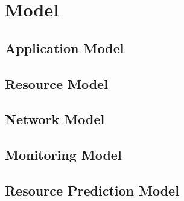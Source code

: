 \chapter{Model} %
\label{ch:model-methodology}

    \section{Application Model}
    \label{sec:application-model}
    \section{Resource Model}
    \label{sec:resource-model}
    \section{Network Model}
    \label{sec:network-model}
    \section{Monitoring Model}
    \label{sec:monitoring-model}
    \section{Resource Prediction Model}
    \label{sec:resource-prediction-model}
